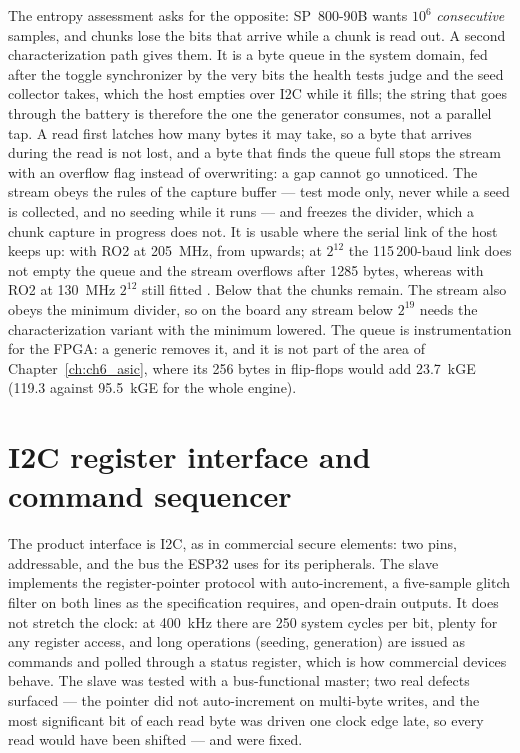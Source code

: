 The entropy assessment asks for the opposite: SP~800-90B wants $10^6$
\emph{consecutive} samples, and chunks lose the bits that arrive while a
chunk is read out. A second characterization path gives them. It is a
byte queue in the system domain, fed after the toggle synchronizer by the
very bits the health tests judge and the seed collector takes, which the
host empties over \ac{I2C} while it fills; the string that goes through
the battery is therefore the one the generator consumes, not a parallel
tap. A read first latches how many bytes it may take, so a byte that
arrives during the read is not lost, and a byte that finds the queue full
stops the stream with an overflow flag instead of overwriting: a gap
cannot go unnoticed. The stream obeys the rules of the capture buffer ---
test mode only, never while a seed is collected, and no seeding while it
runs --- and freezes the divider, which a chunk capture in progress does
not. It is usable where the serial link of
the host keeps up: with RO2 at 205~MHz, from  upwards; at
$2^{12}$ the 115\,200-baud link does not empty the queue and the stream
overflows after 1285 bytes, whereas with RO2 at 130~MHz $2^{12}$ still
fitted \meas{}. Below that the chunks remain. The stream also obeys the
minimum divider, so on the board any stream below $2^{19}$ needs the
characterization variant with the minimum lowered. The queue is
instrumentation for
the \ac{FPGA}: a generic removes it, and it is not part of the area of
Chapter~\ref{ch:ch6_asic}, where its 256 bytes in flip-flops would add
23.7~kGE \simu{} (119.3 against 95.5~kGE for the whole engine).

\section{I2C register interface and command sequencer}
\label{sec:i2c}

The product interface is \ac{I2C}, as in commercial secure elements: two
pins, addressable, and the bus the ESP32 uses for its peripherals. The
slave implements the register-pointer protocol with auto-increment, a
five-sample glitch filter on both lines as the specification requires,
and open-drain outputs. It does not stretch the clock: at 400~kHz there
are 250 system cycles per bit, plenty for any register access, and long
operations (seeding, generation) are issued as commands and polled
through a status register, which is how commercial devices behave. The
slave was tested with a bus-functional master; two real defects surfaced
--- the pointer did not auto-increment on multi-byte writes, and the most
significant bit of each read byte was driven one clock edge late, so
every read would have been shifted --- and were fixed.

